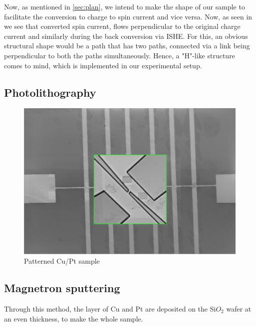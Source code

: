 Now, as mentioned in \cref{sec:plan}, we intend to make the shape of our sample to facilitate the conversion to charge to spin current and vice versa.
Now, as seen in %
we see that converted spin current, flows perpendicular to the original charge current and similarly during the back conversion via ISHE.
For this, an obvious structural shape would be a path that has two paths, connected via a link being perpendicular to both the paths simultaneously.
Hence, a "H"-like structure comes to mind, which is implemented in our experimental setup.

\subsection{Photolithography}

\begin{figure}[h!]
    \includegraphics[width=\columnwidth]{newtrack.png}
    \caption{Patterned Cu/Pt sample}
\end{figure}

\subsection{Magnetron sputtering}

Through this method, the layer of Cu and Pt are deposited on the Si$O_2$ wafer at an even thickness, to make the whole sample.
